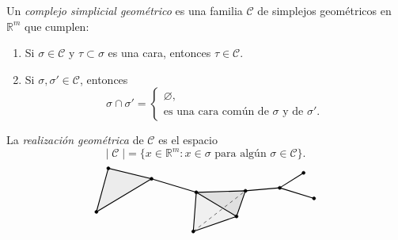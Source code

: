 \begin{definicion}
Un \textit{complejo simplicial geométrico} es una familia $\mathcal{C}$ de simplejos geométricos en $\mathbb{R}^m$ que cumplen:
\begin{enumerate}
    \item Si $\sigma \in \mathcal{C}$ y $\tau \subset \sigma$ es una cara, entonces $\tau \in \mathcal{C}$.
    \item Si $\sigma, \sigma' \in \mathcal{C}$, entonces
    \[
    \sigma \cap \sigma' = 
    \begin{cases}
        \varnothing,\\
        \text{es una cara común de } \sigma \text{ y de } \sigma'.
    \end{cases}
    \]
\end{enumerate}
La \textit{realización geométrica} de $\mathcal{C}$ es el espacio
\[
|\;\mathcal{C}\;| = \{ x \in \mathbb{R}^m : x \in \sigma \text{ para algún } \sigma \in \mathcal{C} \}.
\]
\[
\begin{tikzpicture}[scale=0.95]
    \coordinate (A0) at (0, 0);
    \coordinate (A1) at (0.4, 1.45);
    \coordinate (A2) at (1.85, 1.1);

    \coordinate (B0) at (3.35, 0.65);
    \coordinate (B1) at (3.25, -0.65);
    \coordinate (B2) at (4.7, -0.15);
    \coordinate (B3) at (5.0, 0.7);

    \coordinate (C0) at (6.15, 0.8);
    \coordinate (C1) at (6.95, 1.3);
    \coordinate (C2) at (7.3, 0.45);

    \fill[gray!15] (A0) -- (A1) -- (A2) -- cycle;

    \fill[gray!12] (B0) -- (B1) -- (B2) -- cycle;
    \fill[gray!24] (B0) -- (B2) -- (B3) -- cycle;

    \draw[dashed, thin] (B1) -- (B3);

    \draw[thick] (A0) -- (A1) -- (A2) -- cycle;
    \draw[thick] (A2) -- (B0);
    \draw[thick] (B0) -- (B1) -- (B2) -- (B3) -- cycle;
    \draw[thick] (B0) -- (B2);
    \draw[thick] (B3) -- (C0);
    \draw[thick] (C0) -- (C1);
    \draw[thick] (C0) -- (C2);

    \foreach \p in {A0, A1, A2, B0, B1, B2, B3, C0, C1, C2} {
        \filldraw (\p) circle (1.5pt);
    }
\end{tikzpicture}
\]
\end{definicion}


